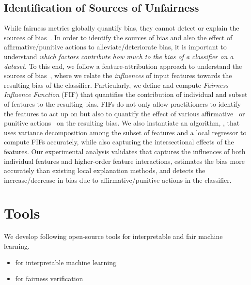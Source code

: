 \subsection*{Identification of Sources of Unfairness}
While fairness metrics globally quantify bias, they cannot detect or explain the sources of bias~\cite{begley2020explainability,lundberg2020explaining,pan2021explaining}. In order to identify the sources of bias and also the effect of affirmative/punitive actions to alleviate/deteriorate bias, it is important to understand \textit{which factors contribute how much to the bias of a classifier on a dataset}. To this end, we follow a feature-attribution approach to understand the sources of bias~\cite{begley2020explainability,lundberg2020explaining}, where we relate the \emph{influences} of input features towards the resulting bias of the classifier. Particularly, we define and compute \textit{Fairness Influence Function} (FIF) that quantifies the contribution of individual and subset of features to the resulting bias. FIFs do not only allow practitioners to identify the features to act up on but also to quantify the effect of various affirmative~\cite{calmon2017optimized,hardt2016equality,kamiran2012decision,zemel2013learning,zhang2018mitigating,zhang2018fairness,zhang2019faht} or punitive actions~\cite{hua2021human,mehrabi2020exacerbating,solans2020poisoning} on the resulting bias. We also instantiate an algorithm, {\fairXplainer}, that uses variance decomposition among the subset of features and a local regressor to compute FIFs accurately, while also capturing the intersectional effects of the features. Our experimental analysis validates that {\fairXplainer} captures the influences of both individual features and higher-order feature interactions, estimates the bias more accurately than existing local explanation methods, and detects the increase/decrease in bias due to affirmative/punitive actions in the classifier.

\section{Tools}
	We develop following open-source tools for interpretable and fair machine learning.
	\begin{itemize}
		\item \href{https://github.com/meelgroup/MLIC}{{\imli}} for interpretable machine learning
		\item  \href{https://github.com/meelgroup/justicia}{\justicia} for fairness verification
	\end{itemize}
